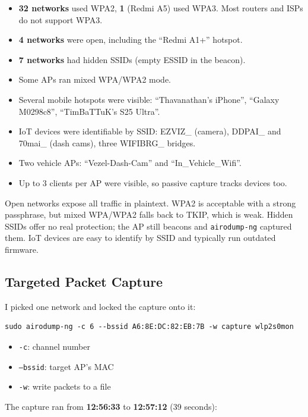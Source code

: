 \documentclass[12pt,a4paper]{article}
\begin{document}
\begin{itemize}
    \item \textbf{32 networks} used WPA2, \textbf{1} (Redmi A5) used WPA3. Most routers and ISPs do not support WPA3.
    \item \textbf{4 networks} were open, including the ``Redmi A1+'' hotspot.
    \item \textbf{7 networks} had hidden SSIDs (empty ESSID in the beacon).
    \item Some APs ran mixed WPA/WPA2 mode.
    \item Several mobile hotspots were visible: ``Thavanathan's iPhone'', ``Galaxy M0298c8'', ``TimBaTTuK's S25 Ultra''.
    \item IoT devices were identifiable by SSID: EZVIZ\_ (camera), DDPAI\_ and 70mai\_ (dash cams), three WIFIBRG\_ bridges.
    \item Two vehicle APs: ``Vezel-Dash-Cam'' and ``In\_Vehicle\_Wifi''.
    \item Up to 3 clients per AP were visible, so passive capture tracks devices too.
\end{itemize}

Open networks expose all traffic in plaintext. WPA2 is acceptable with a strong passphrase, but mixed WPA/WPA2 falls back to TKIP, which is weak. Hidden SSIDs offer no real protection; the AP still beacons and \texttt{airodump-ng} captured them. IoT devices are easy to identify by SSID and typically run outdated firmware.

\subsection{Targeted Packet Capture}

I picked one network and locked the capture onto it:

\begin{lstlisting}
sudo airodump-ng -c 6 --bssid A6:8E:DC:82:EB:7B -w capture wlp2s0mon
\end{lstlisting}

\begin{itemize}
    \item \texttt{-c}: channel number
    \item \texttt{--bssid}: target AP's MAC
    \item \texttt{-w}: write packets to a file
\end{itemize}

The capture ran from \textbf{12:56:33} to \textbf{12:57:12} (39 seconds):
\end{document}

